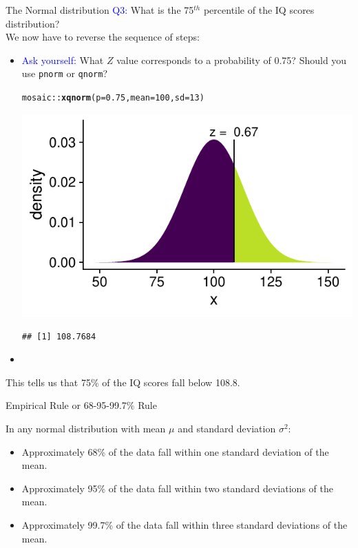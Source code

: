 \documentclass[10pt,handout]{beamer}\usepackage[]{graphicx}\usepackage[]{color}
\makeatletter
\newcommand{\hlnum}[1]{\textcolor[rgb]{0.686,0.059,0.569}{#1}}%
\newcommand{\hlopt}[1]{\textcolor[rgb]{0,0,0}{#1}}%
\newcommand{\hlstd}[1]{\textcolor[rgb]{0.345,0.345,0.345}{#1}}%
\newcommand{\hlkwc}[1]{\textcolor[rgb]{0.333,0.667,0.333}{#1}}%
\newcommand{\hlkwd}[1]{\textcolor[rgb]{0.737,0.353,0.396}{\textbf{#1}}}%
\newenvironment{kframe}{%
 \def\at@end@of@kframe{}%
 \ifinner\ifhmode%
  \def\at@end@of@kframe{\end{minipage}}%
  \begin{minipage}{\columnwidth}%
 \fi\fi%
 \def\FrameCommand##1{\hskip\@totalleftmargin \hskip-\fboxsep
 \colorbox{shadecolor}{##1}\hskip-\fboxsep
     \hskip-\linewidth \hskip-\@totalleftmargin \hskip\columnwidth}%
 \MakeFramed {\advance\hsize-\width
   \@totalleftmargin\z@ \linewidth\hsize
   \@setminipage}}%
 {\par\unskip\endMakeFramed%
 \at@end@of@kframe}
\newenvironment{knitrout}{}{} %
\makeatother
\begin{document}
\begin{frame}[fragile]{The Normal distribution}
	\textcolor{blue}{Q3:}
	What is the 75$^{th}$ percentile of the IQ scores distribution? \\
	We now have to reverse the sequence of steps: \pause
	\begin{itemize}
		\item \textcolor{blue}{Ask yourself:} What $Z$ value corresponds to a probability of 0.75? Should you use \texttt{pnorm} or \texttt{qnorm}? \pause
		
\begin{knitrout}\tiny
{}\color{fgcolor}\begin{kframe}
\begin{alltt}
\hlstd{mosaic}\hlopt{::}\hlkwd{xqnorm}\hlstd{(}\hlkwc{p} \hlstd{=} \hlnum{0.75}\hlstd{,} \hlkwc{mean} \hlstd{=} \hlnum{100}\hlstd{,} \hlkwc{sd} \hlstd{=} \hlnum{13}\hlstd{)}
\end{alltt}
\end{kframe}

{\centering \includegraphics[width=0.6\linewidth]{figure/probs8-1} 

}


\begin{kframe}\begin{verbatim}
## [1] 108.7684
\end{verbatim}
\end{kframe}
\end{knitrout}
		
		\item[]
	\end{itemize} This tells us that 75\% of the IQ scores fall below 108.8. 
\end{frame}


\begin{frame}[fragile]{Empirical Rule or 68-95-99.7\% Rule}
	
	In any normal distribution with mean $\mu$ and standard deviation $\sigma^2$:
	\begin{itemize}
		\setlength\itemsep{2em}
		\item Approximately 68\% of the data fall within one standard deviation of the mean.
		\item Approximately 95\% of the data fall within two standard deviations of the mean.
		\item Approximately 99.7\% of the data fall within three standard deviations of the mean.
	\end{itemize}
\end{frame}
\end{document}
